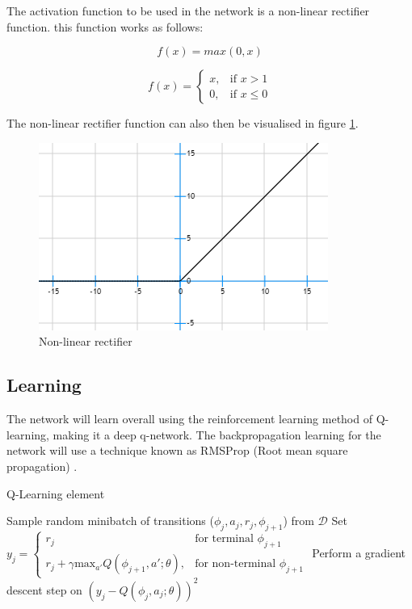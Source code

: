 \documentclass[10pt]{article}
\begin{document}
		The activation function to be used in the network is a non-linear rectifier function. this function works as follows:
		
		\begin{equation}\label{eq:activ2}
				f(x) = max (0, x)
		\end{equation}
		
		\begin{equation}\label{eq:activ1}
			f(x) =
			\begin{cases}
   				x,& \text{if } x > 1\\
    			0,& \text{if } x \leq 0
			\end{cases}
		\end{equation}	
		
		The non-linear rectifier function can also then be visualised in figure \ref{fig:nlrf}.		
		
		\begin{figure}[h]
    		\centering
			\includegraphics[scale=0.8]{img/linearity}
			\caption{Non-linear rectifier}
			\label{fig:nlrf}
		\end{figure}
	\medskip
	
	\subsection{Learning}
		The network will learn overall using the reinforcement learning method of Q-learning, making it a deep q-network. The backpropagation learning for the network will use a technique known as RMSProp (Root mean square propagation) \cite{rms}.
		\begin{algorithm}
			\caption{Q-Learning element \cite{humanlevel}}
			\label{algo:qlearn}
			\begin{algorithmic}[1]
				\State Sample random minibatch of transitions ($\phi_j,a_j,r_j,\phi_{j+1}$) from $\mathcal{D}$
				\State Set $y_j =
					\begin{cases}
   						r_j& \text{for terminal } \phi_{j+1}\\
    					r_j + \gamma \text{max}_{a'}Q(\phi_{j+1},a';\theta),& \text{for non-terminal } \phi_{j+1}
					\end{cases}$
				\State Perform a gradient descent step on $(y_j - Q(\phi_j,a_j;\theta))^2$
			\end{algorithmic}
		\end{algorithm}
		
\end{document}
